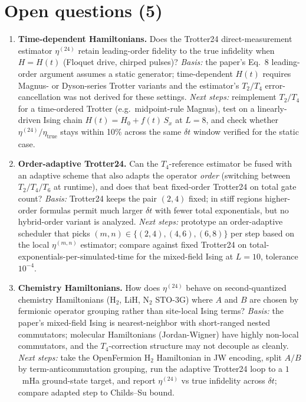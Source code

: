\section{Open questions (5)}

\begin{enumerate}

\item \textbf{Time-dependent Hamiltonians.}
Does the Trotter24 direct-measurement estimator $\eta^{(24)}$ retain leading-order fidelity to the true infidelity when $H = H(t)$ (Floquet drive, chirped pulses)?
\emph{Basis:} the paper's Eq.~8 leading-order argument assumes a static generator; time-dependent $H(t)$ requires Magnus- or Dyson-series Trotter variants and the estimator's $T_2/T_4$ error-cancellation was not derived for these settings.
\emph{Next steps:} reimplement $T_2/T_4$ for a time-ordered Trotter (e.g.\ midpoint-rule Magnus), test on a linearly-driven Ising chain $H(t)=H_0 + f(t)\,S_x$ at $L{=}8$, and check whether $\eta^{(24)}/\eta_\text{true}$ stays within 10\% across the same $\delta t$ window verified for the static case.

\item \textbf{Order-adaptive Trotter24.}
Can the $T_4$-reference estimator be fused with an adaptive scheme that also adapts the operator \emph{order} (switching between $T_2/T_4/T_6$ at runtime), and does that beat fixed-order Trotter24 on total gate count?
\emph{Basis:} Trotter24 keeps the pair $(2,4)$ fixed; in stiff regions higher-order formulas permit much larger $\delta t$ with fewer total exponentials, but no hybrid-order variant is analyzed.
\emph{Next steps:} prototype an order-adaptive scheduler that picks $(m,n)\in\{(2,4),(4,6),(6,8)\}$ per step based on the local $\eta^{(m,n)}$ estimator; compare against fixed Trotter24 on total-exponentials-per-simulated-time for the mixed-field Ising at $L{=}10$, tolerance $10^{-4}$.

\item \textbf{Chemistry Hamiltonians.}
How does $\eta^{(24)}$ behave on second-quantized chemistry Hamiltonians (H$_2$, LiH, N$_2$ STO-3G) where $A$ and $B$ are chosen by fermionic operator grouping rather than site-local Ising terms?
\emph{Basis:} the paper's mixed-field Ising is nearest-neighbor with short-ranged nested commutators; molecular Hamiltonians (Jordan-Wigner) have highly non-local commutators, and the $T_4$-correction structure may not decouple as cleanly.
\emph{Next steps:} take the OpenFermion H$_2$ Hamiltonian in JW encoding, split $A/B$ by term-anticommutation grouping, run the adaptive Trotter24 loop to a $1$~mHa ground-state target, and report $\eta^{(24)}$ vs true infidelity across $\delta t$; compare adapted step to Childs--Su bound.


\end{enumerate}
